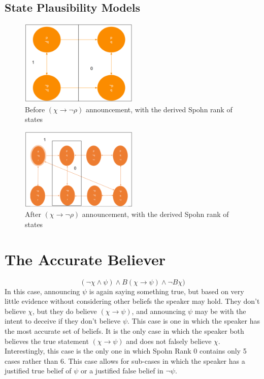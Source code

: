 \documentclass[12pt, titlepage, twoside, a4paper]{report}
\begin{document}
\subsection{State Plausibility Models}
\quad
\newline
\begin{figure}[h!]
  \centering
  \includegraphics[width=0.5\textwidth]{slide30.eps}
  \caption{Before $(\chi \to \neg \rho)$ announcement, with the derived Spohn rank of states}
\end{figure}
\begin{figure}[h!]
  \centering
  \includegraphics[width=0.5\textwidth]{slide32.eps}
  \caption{After $(\chi \to \neg \rho)$ announcement, with the derived Spohn rank of states}
\end{figure}
\quad
\newline

\section{The Accurate Believer}
$$(\neg \chi \wedge \psi) \wedge B(\chi \to \psi) \wedge \neg B \chi)$$
In this case, announcing $\psi$ is again saying something true, but based on very little evidence without considering other beliefs the speaker may hold. They don’t believe $\chi$, but they do believe $(\chi \to \psi)$, and announcing $\psi$ may be with the intent to deceive if they don't believe $\psi$. This case is one in which the speaker has the most accurate set of beliefs. It is the only case in which the speaker both believes the true statement $(\chi \to \psi)$ and does not falsely believe $\chi$. Interestingly, this case is the only one in which Spohn Rank 0 contains only 5 cases rather than 6. This case allows for sub-cases in which the speaker has a justified true belief of $\psi$ or a justified false belief in $\neg \psi$.
\end{document}
